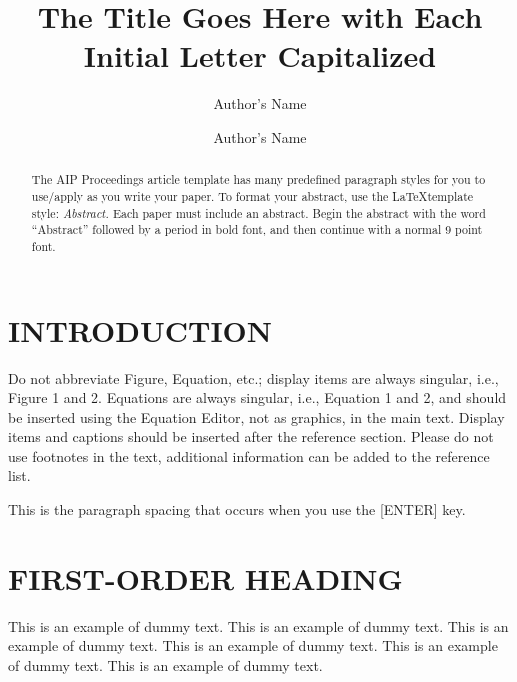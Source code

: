 \documentclass{aip-cp}
\begin{document}
\title{The Title Goes Here with Each Initial Letter Capitalized}

\author[aff1]{Author's Name}
\author[aff2,aff3]{Author's Name}


\maketitle

\begin{abstract}
The AIP Proceedings article template has many predefined paragraph styles for you to use/apply as you write your paper. To format your abstract, use the \LaTeX template style: {\itshape Abstract.} Each paper must include an abstract. Begin the abstract with the word ``Abstract'' followed by a period in bold font, and then continue with a normal 9 point font.
\end{abstract}

\section{INTRODUCTION}
Do not abbreviate Figure, Equation, etc.; display items are always singular, i.e., Figure 1 and 2. Equations are always singular, i.e., Equation 1 and 2, and should be inserted using the Equation Editor, not as graphics, in the main text.  Display items and captions should be inserted after the reference section. Please do not use footnotes in the text, additional information can be added to the reference list.

This is the paragraph spacing that occurs when you use the [ENTER] key.


\section{FIRST-ORDER HEADING}
This is an example of dummy text. This is an example of dummy text. This is an example of dummy text.
This is an example of dummy text. This is an example of dummy text. This is an example of dummy text.
\end{document}

